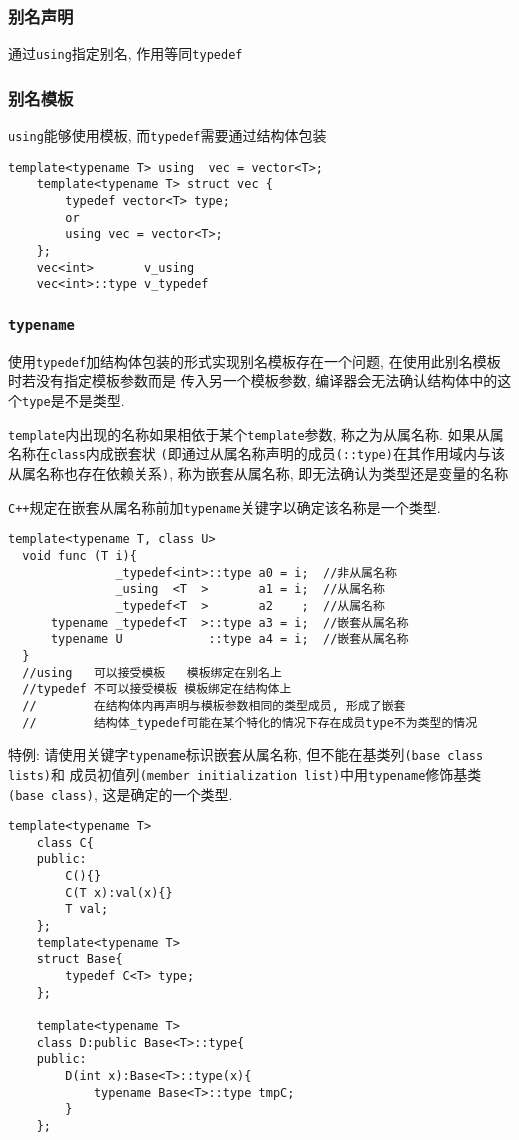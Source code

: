 \subsubsection{别名声明}
通过{\tt using}指定别名, 作用等同{\tt typedef}
\subsubsection{别名模板}
{\tt using}能够使用模板, 而{\tt typedef}需要通过结构体包装
\begin{lstlisting}[xleftmargin=2em,xrightmargin=2em]
	template<typename T> using  vec = vector<T>;
	template<typename T> struct vec {
		typedef vector<T> type;
		or
		using vec = vector<T>;
	};
	vec<int>       v_using
	vec<int>::type v_typedef
\end{lstlisting}
\subsubsection{\tt{typename}}
使用{\tt typedef}加结构体包装的形式实现别名模板存在一个问题, 在使用此别名模板时若没有指定模板参数而是
	传入另一个模板参数, 编译器会无法确认结构体中的这个{\tt type}是不是类型.

{\tt template}内出现的名称如果相依于某个{\tt template}参数, 称之为从属名称. 如果从属名称在{\tt class}内成嵌套状
	{\tt (}即通过从属名称声明的成员{\tt (::type)}在其作用域内与该从属名称也存在依赖关系{\tt )}, 
	称为嵌套从属名称, 即无法确认为类型还是变量的名称

{\tt C++}规定在嵌套从属名称前加{\tt typename}关键字以确定该名称是一个类型.
\begin{lstlisting}[xleftmargin=2em,xrightmargin=2em]
  template<typename T, class U> 
  void func (T i){
		       _typedef<int>::type a0 = i;  //非从属名称
			   _using  <T  >       a1 = i;  //从属名称
		       _typedef<T  >       a2    ;  //从属名称
	  typename _typedef<T  >::type a3 = i;  //嵌套从属名称
      typename U            ::type a4 = i;  //嵌套从属名称
  }
  //using   可以接受模板   模板绑定在别名上
  //typedef 不可以接受模板 模板绑定在结构体上
  //		在结构体内再声明与模板参数相同的类型成员, 形成了嵌套
  //	    结构体_typedef可能在某个特化的情况下存在成员type不为类型的情况
\end{lstlisting}

特例: 请使用关键字{\tt typename}标识嵌套从属名称, 但不能在基类列{\tt (base class lists)}和
	成员初值列{\tt (member initialization list)}中用{\tt typename}修饰基类{\tt (base class)}, 
	这是确定的一个类型.

\begin{lstlisting}[xleftmargin=2em,xrightmargin=2em]
	template<typename T>
	class C{
	public:
		C(){}
		C(T x):val(x){}
		T val;
	};
	template<typename T>
	struct Base{
		typedef C<T> type;
	};

	template<typename T>
	class D:public Base<T>::type{
	public:
		D(int x):Base<T>::type(x){
			typename Base<T>::type tmpC;
		}
	};
\end{lstlisting}

